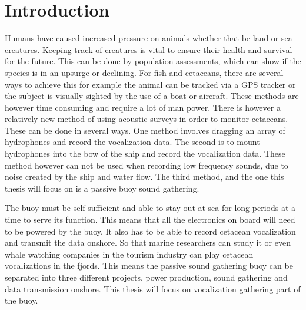 \chapter{Introduction\label{cha:introduction}}




Humans have caused increased pressure on animals whether that be land or sea creatures.
Keeping track of creatures is vital to ensure their health and survival for the future.
This can be done by population assessments, which can show if the species is in an upsurge or declining.
For fish and cetaceans, there are several ways to achieve this for example the animal can be tracked via a GPS tracker or the subject is visually sighted by the use of a boat or aircraft.
These methods are however time consuming and require a lot of man power.
There is however a relatively new method of using  acoustic surveys in order to monitor cetaceans.
These can be done in several ways.
One method involves dragging an array of hydrophones and record the vocalization data.
The second is to mount hydrophones into the bow of the ship and record the vocalization data.
These method however can not be used when recording low frequency sounds, due to noise created by the ship and water flow.
The third method, and the one this thesis will focus on is a passive buoy sound gathering. 

The buoy must be self sufficient and able to stay out at sea for long periods at a time to serve its function.
This means that all the electronics on board will need to be powered by the buoy.
It also has to be able to record cetacean vocalization and transmit the data onshore.
So that marine researchers can study it or even whale watching companies in the tourism industry can play cetacean vocalizations in the fjords.
This means the passive sound gathering buoy can be separated into three different projects, power production, sound gathering and data transmission onshore.
This thesis will focus on vocalization gathering part of the buoy.

